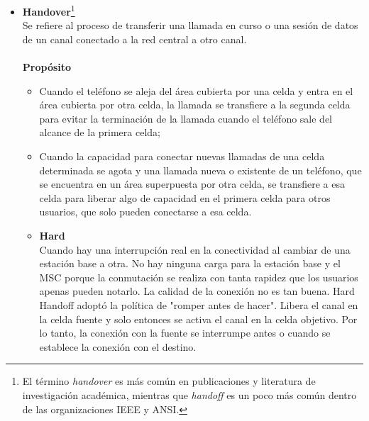 \begin{itemize}
\begin{itemize}
		
	\end{itemize}

		
	
	\item \textbf{{\color{red}Handover}}\footnote{El término \textit{handover} es más común en publicaciones y literatura de investigación académica, mientras que \textit{handoff} es un poco más común dentro de las organizaciones IEEE y ANSI.} \\
	Se refiere al proceso de transferir una llamada en curso o una sesión de datos de un canal conectado a la red central a otro canal. \\{ }\\
	\textbf{Propósito}
	\begin{itemize}
	\item Cuando el teléfono se aleja del área cubierta por una celda y entra en el área cubierta por otra celda, la llamada se transfiere a la segunda celda para evitar la terminación de la llamada cuando el teléfono sale del alcance de la primera celda;
	\item Cuando la capacidad para conectar nuevas llamadas de una celda determinada se agota y una llamada nueva o existente de un teléfono, que se encuentra en un área superpuesta por otra celda, se transfiere a esa celda para liberar algo de capacidad en el primera celda para otros usuarios, que solo pueden conectarse a esa celda.
	\end{itemize}		
	
	\begin{itemize}
		\item \textbf{{\color{red}Hard}}\\
		Cuando hay una interrupción real en la conectividad al cambiar de una estación base a otra. No hay ninguna carga para la estación base y el MSC porque la conmutación se realiza con tanta rapidez que los usuarios apenas pueden notarlo. La calidad de la conexión no es tan buena. Hard Handoff adoptó la política de "romper antes de hacer". Libera el canal en la celda fuente y solo entonces se activa el canal en la celda objetivo. Por lo tanto, la conexión con la fuente se interrumpe antes o cuando se establece la conexión con el destino.
		

\end{itemize}
\end{itemize}
